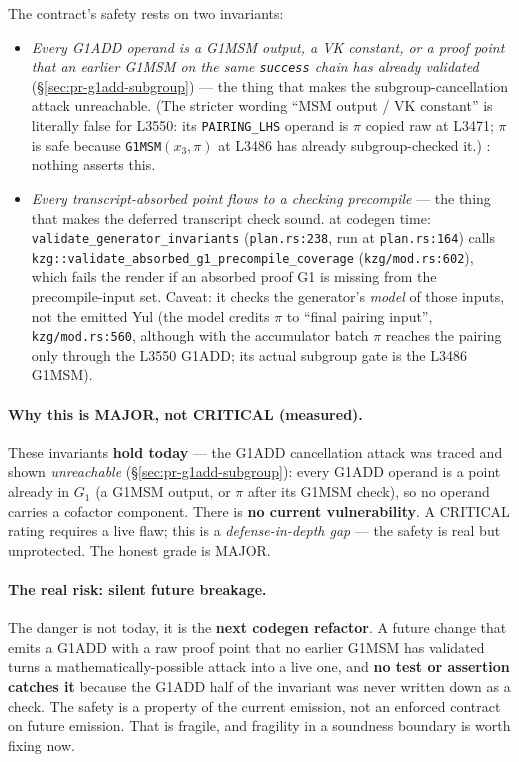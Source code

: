 The contract's safety rests on two invariants:
\begin{itemize}[leftmargin=1.4em,itemsep=2pt]
\item \emph{Every G1ADD operand is a G1MSM output, a VK constant,
  or a proof point that an earlier G1MSM on the same
  \texttt{success} chain has already validated}
  (\S\ref{sec:pr-g1add-subgroup}) --- the thing that makes the
  subgroup-cancellation attack unreachable. (The stricter wording
  ``MSM output / VK constant'' is literally false for L3550: its
  \texttt{PAIRING\_LHS} operand is $\pi$ copied raw at L3471; $\pi$
  is safe because \texttt{G1MSM}$(x_3,\pi)$ at L3486 has already
  subgroup-checked it.) : nothing asserts this.
\item \emph{Every transcript-absorbed point flows to a checking
  precompile} --- the thing that makes the deferred transcript
  check sound.  at codegen time:
  \texttt{validate\_\allowbreak{}generator\_\allowbreak{}invariants} (\texttt{plan.rs:238},
  run at \texttt{plan.rs:164}) calls
  \texttt{kzg::validate\_\allowbreak{}absorbed\_\allowbreak{}g1\_\allowbreak{}precompile\_\allowbreak{}coverage}
  (\texttt{kzg/mod.rs:602}), which fails the render if an absorbed
  proof G1 is missing from the precompile-input set. Caveat: it
  checks the generator's \emph{model} of those inputs, not the
  emitted Yul (the model credits $\pi$ to ``final pairing input'',
  \texttt{kzg/mod.rs:560}, although with the accumulator batch
  $\pi$ reaches the pairing only through the L3550 G1ADD; its
  actual subgroup gate is the L3486 G1MSM).
\end{itemize}

\paragraph{Why this is MAJOR, not CRITICAL (measured).}
These invariants \textbf{hold today} --- the G1ADD cancellation
attack was traced and shown \emph{unreachable}
(\S\ref{sec:pr-g1add-subgroup}): every G1ADD operand is a
point already in $G_1$ (a G1MSM output, or $\pi$ after its G1MSM
check), so no operand carries a cofactor component. There is \textbf{no
current vulnerability}. A CRITICAL rating requires a live flaw;
this is a \emph{defense-in-depth gap} --- the safety is real but
unprotected. The honest grade is MAJOR.

\paragraph{The real risk: silent future breakage.}
The danger is not today, it is the \textbf{next codegen
refactor}. A future change that emits a G1ADD with a raw proof
point that no earlier G1MSM has validated turns a mathematically-possible attack into a
live one, and \textbf{no test or assertion catches it} because
the G1ADD half of the invariant was never written down as a check. The safety is a
property of the current emission, not an enforced contract on
future emission. That is fragile, and fragility in a soundness
boundary is worth fixing now.

